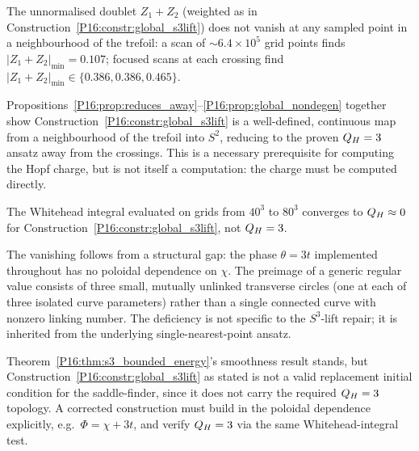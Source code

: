 \begin{proposition}
\label{P16:prop:global_nondegen}
The unnormalised doublet $Z_1+Z_2$ (weighted as in
Construction~\ref{P16:constr:global_s3lift}) does not vanish at any sampled
point in a neighbourhood of the trefoil: a scan of $\sim6.4\times10^5$
grid points finds $|Z_1+Z_2|_{\min}=0.107$; focused scans at each
crossing find $|Z_1+Z_2|_{\min}\in\{0.386,0.386,0.465\}$.
\end{proposition}

\begin{remark}
\label{P16:rem:nondegen_scope}
Propositions~\ref{P16:prop:reduces_away}--\ref{P16:prop:global_nondegen} together
show Construction~\ref{P16:constr:global_s3lift} is a well-defined, continuous
map from a neighbourhood of the trefoil into $S^2$, reducing to the
proven $Q_H=3$ ansatz away from the crossings. This is a necessary
prerequisite for computing the Hopf charge, but is not itself a
computation: the charge must be computed directly.
\end{remark}

\begin{proposition}
\label{P16:prop:s3lift_charge_zero}
The Whitehead integral evaluated on grids from $40^3$ to $80^3$
converges to $Q_H\approx0$ for Construction~\ref{P16:constr:global_s3lift},
not $Q_H=3$.
\end{proposition}

\begin{remark}
\label{P16:rem:missing_poloidal_winding}
The vanishing follows from a structural gap: the phase $\theta=3t$
implemented throughout has no poloidal dependence on $\chi$. The
preimage of a generic regular value consists of three small, mutually
unlinked transverse circles (one at each of three isolated curve
parameters) rather than a single connected curve with nonzero linking
number. The deficiency is not specific to the $S^3$-lift repair; it
is inherited from the underlying single-nearest-point ansatz.
\end{remark}

\begin{remark}
\label{P16:rem:s3lift_not_sufficient}
Theorem~\ref{P16:thm:s3_bounded_energy}'s smoothness result stands, but
Construction~\ref{P16:constr:global_s3lift} as stated is not a valid
replacement initial condition for the saddle-finder, since it does not
carry the required $Q_H=3$ topology. A corrected construction must build
in the poloidal dependence explicitly, e.g.\ $\Phi=\chi+3t$, and verify
$Q_H=3$ via the same Whitehead-integral test.
\end{remark}

